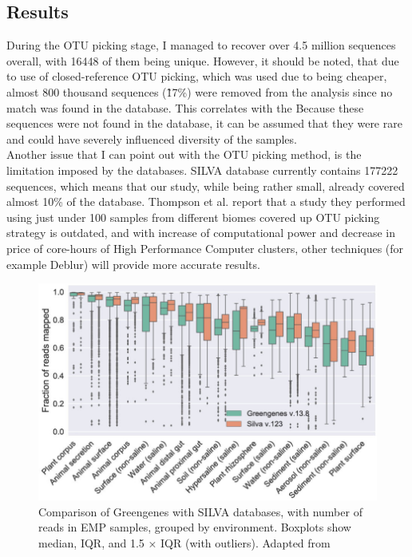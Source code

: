 \documentclass{article}
\begin{document}
\begin{multicols}{2}


\section{Results}

During the OTU picking stage, I managed to recover over 4.5 million sequences overall, with 16448 of them being unique. However, it should be noted, that due to use of closed-reference OTU picking, which was used due to being cheaper, almost 800 thousand sequences (\~17\%) were removed from the analysis since no match was found in the database. This correlates with the  Because these sequences were not found in the database, it can be assumed that they were rare and could have severely influenced diversity of the samples.\\
%
Another issue that I can point out with the OTU picking method, is the limitation imposed by the databases. SILVA database currently contains 177222 sequences, which means that our study, while being rather small, already covered almost 10\% of the database. Thompson et al.\cite{Thompson2017} report that a study they performed using just under 100 samples from different biomes covered up OTU picking strategy is outdated, and with increase of computational power and decrease in price of core-hours of High Performance Computer clusters, other techniques (for example Deblur\cite{Amir}) will provide more accurate results. \\

\begin{figure}
	\includegraphics[width=\linewidth]{./figs/EMP_SILVA.jpg}
	\caption{Comparison of Greengenes with SILVA databases, with number of reads in EMP samples, grouped by environment. Boxplots show median, IQR, and 1.5 × IQR (with outliers). Adapted from \cite{Thompson2017}}
	\label{fig:EMP_Silva}
\end{figure}




\end{multicols}
\end{document}
